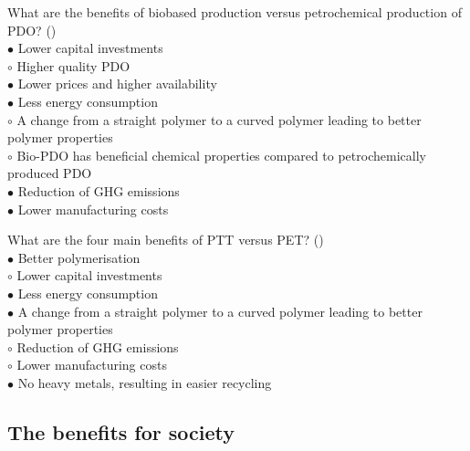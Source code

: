 \documentclass[]{beamer}
\begin{document}
\begin{CJK}{UTF8}{gbsn}
\begin{frame}[shrink] {} 
\addtocounter{answers}{1}
\color{blue}
  What are the benefits of biobased production versus petrochemical production of PDO?
 ({})\\
\color{black}
\setlength{\parindent}{-0.4cm}
{\color{red}$\bullet$} Lower capital investments  \\
{\color{red}$\circ$} Higher quality PDO   \\
{\color{red}$\bullet$} Lower prices and higher availability  \\
{\color{red}$\bullet$} Less energy consumption  \\
{\color{red}$\circ$} A change from a straight polymer to a curved polymer leading to better polymer properties  \\
{\color{red}$\circ$} Bio-PDO has beneficial chemical properties compared to petrochemically produced PDO  \\
{\color{red}$\bullet$} Reduction of GHG emissions  \\
{\color{red}$\bullet$} Lower manufacturing costs  \\
\end{frame}


\begin{frame}[shrink] {} 
\addtocounter{answers}{1}
\color{blue}
  What are the four main benefits of PTT versus PET?
 ({})\\
\color{black}
\setlength{\parindent}{-0.4cm}
{\color{red}$\bullet$} Better polymerisation   \\
{\color{red}$\circ$} Lower capital investments  \\
{\color{red}$\bullet$} Less energy consumption  \\
{\color{red}$\bullet$} A change from a straight polymer to a curved polymer leading to better polymer properties  \\
{\color{red}$\circ$} Reduction of GHG emissions  \\
{\color{red}$\circ$} Lower manufacturing costs  \\
{\color{red}$\bullet$} No heavy metals, resulting in easier recycling  \\

\end{frame}


\subsection{The benefits for society}
\setcounter{answers}{0}



\end{CJK}
\end{document}
